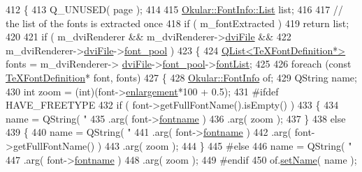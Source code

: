 \begin{DoxyCode}
412 \{
413     Q\_UNUSED( page );
414 
415     \hyperlink{classQList}{Okular::FontInfo::List} list;
416 
417     \textcolor{comment}{// the list of the fonts is extracted once }
418     \textcolor{keywordflow}{if} ( m\_fontExtracted )
419         \textcolor{keywordflow}{return} list;
420 
421     \textcolor{keywordflow}{if} ( m\_dviRenderer && m\_dviRenderer->\hyperlink{classdviRenderer_a67ded13a1a8da343aa0ee921ed96d4c2}{dviFile} &&
422          m\_dviRenderer->\hyperlink{classdviRenderer_a67ded13a1a8da343aa0ee921ed96d4c2}{dviFile}->\hyperlink{classdvifile_a4864f0edcaad892f4684ab2379f061b9}{font\_pool} )
423     \{
424         \hyperlink{classQList}{QList<TeXFontDefinition*>} fonts = m\_dviRenderer->
      \hyperlink{classdviRenderer_a67ded13a1a8da343aa0ee921ed96d4c2}{dviFile}->\hyperlink{classdvifile_a4864f0edcaad892f4684ab2379f061b9}{font\_pool}->\hyperlink{classfontPool_a6a4a93e8193b31519eb5e17c623c65ac}{fontList};
425 
426         \textcolor{keywordflow}{foreach} (\textcolor{keyword}{const} \hyperlink{classTeXFontDefinition}{TeXFontDefinition}* font, fonts)
427         \{
428             \hyperlink{classOkular_1_1FontInfo}{Okular::FontInfo} of;
429             QString name;
430             \textcolor{keywordtype}{int} zoom = (int)(font->\hyperlink{classTeXFontDefinition_ad49309e518eb93ef852667ccc2b324f3}{enlargement}*100 + 0.5);
431 \textcolor{preprocessor}{#ifdef HAVE\_FREETYPE}
432             \textcolor{keywordflow}{if} ( font->getFullFontName().isEmpty() ) 
433             \{
434                 name = QString( \textcolor{stringliteral}{"%
435                         .arg( font->\hyperlink{classTeXFontDefinition_a9f1c42427054d44e3a5f110230858c03}{fontname} )
436                         .arg( zoom );
437             \}
438             \textcolor{keywordflow}{else}
439             \{
440                 name = QString( \textcolor{stringliteral}{"%
441                         .arg( font->\hyperlink{classTeXFontDefinition_a9f1c42427054d44e3a5f110230858c03}{fontname} )
442                         .arg( font->getFullFontName() ) 
443                         .arg( zoom ); 
444             \}
445 \textcolor{preprocessor}{#else}
446             name = QString( \textcolor{stringliteral}{"%
447                     .arg( font->\hyperlink{classTeXFontDefinition_a9f1c42427054d44e3a5f110230858c03}{fontname} )
448                     .arg( zoom );
449 \textcolor{preprocessor}{#endif}
450             of.\hyperlink{classOkular_1_1FontInfo_abd20d06c554455aee07624a6b3917e4e}{setName}( name );
}}}
\end{DoxyCode}
